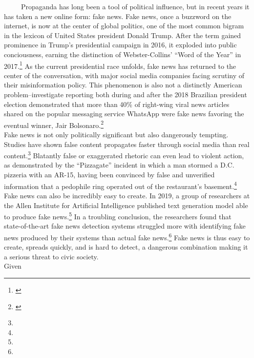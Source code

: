 \documentclass[12pt]{article}
\begin{document}
~~~~~Propaganda has long been a tool of political influence, but in
recent years it has taken a new online form: fake news. Fake news, once
a buzzword on the internet, is now at the center of global politics, one
of the most common bigram in the lexicon of United States president
Donald Trump. After the term gained prominence in Trump's presidential
campaign in 2016, it exploded into public conciousness, earning the
distinction of Webster-Collins' ``Word of the Year'' in 2017.\footnote{\cite{Webster}}
As the current presidential race unfolds, fake news has returned to the
center of the conversation, with major social media companies facing
scrutiny of their misinformation policy. This phenomenon is also not a
distinctly American problem--investigate reporting both during and after
the 2018 Brazilian president election demonstrated that more than 40\%
of right-wing viral news articles shared on the popular messaging
service WhatsApp were fake news favoring the eventual winner, Jair
Bolsonaro.\footnote{\cite{Bolsonaro}}\\
\hspace*{0.333em}\hspace*{0.333em}\hspace*{0.333em}\hspace*{0.333em}\hspace*{0.333em}Fake
news is not only politically significant but also dangerously tempting.
Studies have shown false content propagates faster through social media
than real content.\footnote{} Blatantly false or exaggerated rhetoric
can even lead to violent action, as demonstrated by the ``Pizzagate''
incident in which a man stormed a D.C. pizzeria with an AR-15, having
been convinced by false and unverified information that a pedophile ring
operated out of the restaurant's basement.\footnote{} Fake news can also
be incredibly easy to create. In 2019, a group of researchers at the
Allen Institute for Artificial Intelligence published text generation
model able to produce fake news.\footnote{} In a troubling conclusion,
the researchers found that state-of-the-art fake news detection systems
struggled more with identifying fake news produced by their systems than
actual fake news.\footnote{} Fake news is thus easy to create, spreads
quickly, and is hard to detect, a dangerous combination making it a
serious threat to civic society.\\
\hspace*{0.333em}\hspace*{0.333em}\hspace*{0.333em}\hspace*{0.333em}\hspace*{0.333em}Given
\end{document}
